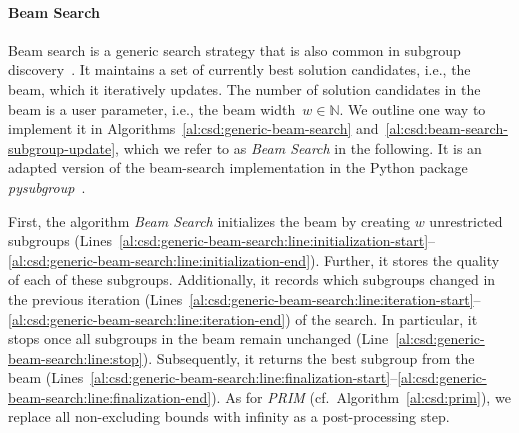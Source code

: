 \documentclass{article}
\theoremstyle{definition}
\begin{document}
\paragraph{Beam Search}

Beam search is a generic search strategy that is also common in subgroup discovery~\cite{atzmueller2005exploiting}.
It maintains a set of currently best solution candidates, i.e., the beam, which it iteratively updates.
The number of solution candidates in the beam is a user parameter, i.e., the beam width~$w \in \mathbb{N}$.
We outline one way to implement it in Algorithms~\ref{al:csd:generic-beam-search} and~\ref{al:csd:beam-search-subgroup-update}, which we refer to as \emph{Beam Search} in the following.
It is an adapted version of the beam-search implementation in the Python package \emph{pysubgroup}~\cite{lemmerich2019pysubgroup}.

First, the algorithm \emph{Beam Search} initializes the beam by creating $w$ unrestricted subgroups (Lines~\ref{al:csd:generic-beam-search:line:initialization-start}--\ref{al:csd:generic-beam-search:line:initialization-end}).
Further, it stores the quality of each of these subgroups.
Additionally, it records which subgroups changed in the previous iteration (Lines~\ref{al:csd:generic-beam-search:line:iteration-start}--\ref{al:csd:generic-beam-search:line:iteration-end}) of the search.
In particular, it stops once all subgroups in the beam remain unchanged (Line~\ref{al:csd:generic-beam-search:line:stop}).
Subsequently, it returns the best subgroup from the beam (Lines~\ref{al:csd:generic-beam-search:line:finalization-start}--\ref{al:csd:generic-beam-search:line:finalization-end}).
As for \emph{PRIM} (cf.~Algorithm~\ref{al:csd:prim}), we replace all non-excluding bounds with infinity as a post-processing step.
\end{document}
